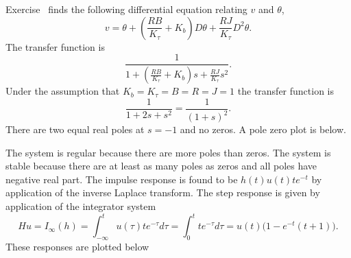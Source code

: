\begin{excersizelist}
\begin{solution}
Exercise~ finds the following differential equation relating $v$ and $\theta$,
\[
v = \theta + \left(\frac{RB}{K_\tau} + K_b\right) D \theta + \frac{RJ}{K_\tau} D^2 \theta.
\]
The transfer function is
\[
\frac{1}{1 + \left(\frac{RB}{K_\tau} + K_b\right) s  + \frac{RJ}{K_\tau} s^2}.
\]
Under the assumption that $K_b=K_\tau=B=R=J=1$ the transfer function is
\[
\frac{1}{1 + 2s  + s^2} = \frac{1}{(1 + s)^2}.
\]
There are two equal real poles at $s = -1$ and no zeros.  A pole zero plot is below.

\begin{center}
\end{center}

The system is regular because there are more poles than zeros.  The system is stable because there are at least as many poles as zeros and all poles have negative real part.  The impulse response is found to be $h(t) u(t) t e^{-t}$ by application of the inverse Laplace transform.  The step response is given by application of the integrator system
\[ 
Hu = I_\infty(h) = \int_{-\infty}^t u(\tau) t e^{-\tau} d\tau = \int_{0}^t t e^{-\tau} d\tau = u(t) \big( 1 - e^{-t}(t+1) \big).
\] 
These responses are plotted below

\begin{center}

\end{center}

\end{solution}


\end{excersizelist}

